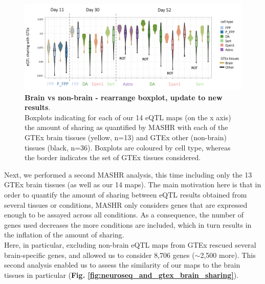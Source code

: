 \begin{figure}[h]
\centering
\includegraphics[width=16cm]{Chapter5/Fig/neuroseq_gtex_brain_nonbrain_boxplots.png}
\caption[Brain vs non-brain]{\textbf{Brain vs non-brain - rearrange boxplot, update to new results}.\\
Boxplots indicating for each of our 14 eQTL maps (on the x axis) the amount of sharing as quantified by MASHR \cite{urbut2019flexible} with each of the GTEx brain tissues (yellow, n=13) and GTEx other (non-brain) tissues (black, n=36).
Boxplots are coloured by cell type, whereas the border indicates the set of GTEx tissues considered.}
\label{fig:neuroseq_and_gtex_brain_specificity}
\end{figure}

\newpage

Next, we performed a second MASHR analysis, this time including only the 13 GTEx brain tissues (as well as our 14 maps).
The main motivation here is that in order to quantify the amount of sharing between eQTL results obtained from several tissues or conditions, MASHR only considers 
genes that are expressed enough to be assayed across all conditions.
As a consequence, the number of genes used decreases the more conditions are included, which in turn results in the inflation of the amount of sharing.\\

Here, in particular, excluding non-brain eQTL maps from GTEx rescued several brain-specific genes, and allowed us to consider 8,706 genes ($\sim$2,500 more).
This second analysis enabled us to assess the similarity of our maps to the brain tissues in particular (\textbf{Fig. \ref{fig:neuroseq_and_gtex_brain_sharing}}). \\

